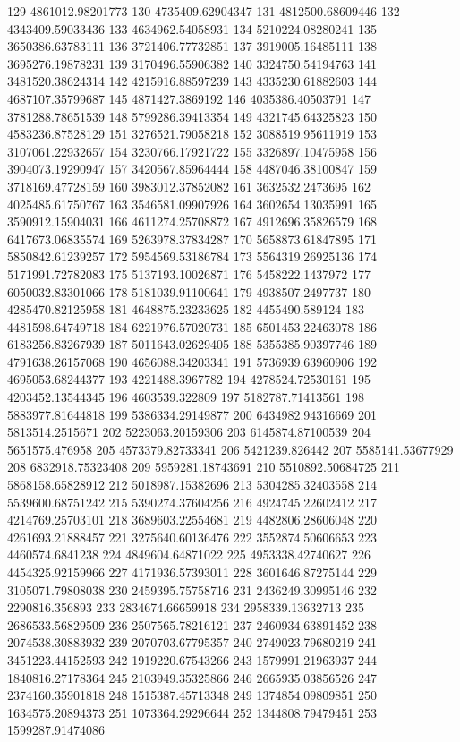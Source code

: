 {129 4861012.98201773
130 4735409.62904347
131 4812500.68609446
132 4343409.59033436
133 4634962.54058931
134 5210224.08280241
135 3650386.63783111
136 3721406.77732851
137 3919005.16485111
138 3695276.19878231
139 3170496.55906382
140 3324750.54194763
141 3481520.38624314
142 4215916.88597239
143 4335230.61882603
144 4687107.35799687
145 4871427.3869192
146 4035386.40503791
147 3781288.78651539
148 5799286.39413354
149 4321745.64325823
150 4583236.87528129
151 3276521.79058218
152 3088519.95611919
153 3107061.22932657
154 3230766.17921722
155 3326897.10475958
156 3904073.19290947
157 3420567.85964444
158 4487046.38100847
159 3718169.47728159
160 3983012.37852082
161 3632532.2473695
162 4025485.61750767
163 3546581.09907926
164 3602654.13035991
165 3590912.15904031
166 4611274.25708872
167 4912696.35826579
168 6417673.06835574
169 5263978.37834287
170 5658873.61847895
171 5850842.61239257
172 5954569.53186784
173 5564319.26925136
174 5171991.72782083
175 5137193.10026871
176 5458222.1437972
177 6050032.83301066
178 5181039.91100641
179 4938507.2497737
180 4285470.82125958
181 4648875.23233625
182 4455490.589124
183 4481598.64749718
184 6221976.57020731
185 6501453.22463078
186 6183256.83267939
187 5011643.02629405
188 5355385.90397746
189 4791638.26157068
190 4656088.34203341
191 5736939.63960906
192 4695053.68244377
193 4221488.3967782
194 4278524.72530161
195 4203452.13544345
196 4603539.322809
197 5182787.71413561
198 5883977.81644818
199 5386334.29149877
200 6434982.94316669
201 5813514.2515671
202 5223063.20159306
203 6145874.87100539
204 5651575.476958
205 4573379.82733341
206 5421239.826442
207 5585141.53677929
208 6832918.75323408
209 5959281.18743691
210 5510892.50684725
211 5868158.65828912
212 5018987.15382696
213 5304285.32403558
214 5539600.68751242
215 5390274.37604256
216 4924745.22602412
217 4214769.25703101
218 3689603.22554681
219 4482806.28606048
220 4261693.21888457
221 3275640.60136476
222 3552874.50606653
223 4460574.6841238
224 4849604.64871022
225 4953338.42740627
226 4454325.92159966
227 4171936.57393011
228 3601646.87275144
229 3105071.79808038
230 2459395.75758716
231 2436249.30995146
232 2290816.356893
233 2834674.66659918
234 2958339.13632713
235 2686533.56829509
236 2507565.78216121
237 2460934.63891452
238 2074538.30883932
239 2070703.67795357
240 2749023.79680219
241 3451223.44152593
242 1919220.67543266
243 1579991.21963937
244 1840816.27178364
245 2103949.35325866
246 2665935.03856526
247 2374160.35901818
248 1515387.45713348
249 1374854.09809851
250 1634575.20894373
251 1073364.29296644
252 1344808.79479451
253 1599287.91474086
}
